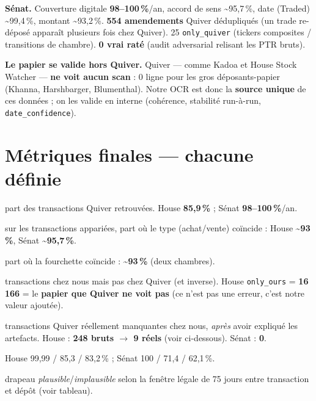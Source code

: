 \documentclass[11pt,a4paper]{article}
\newcommand{\code}[1]{\texttt{\small #1}}
\begin{document}
\textbf{Sénat.} Couverture digitale \textbf{98--100\,\%}/an, accord de sens \textasciitilde 95,7\,\%,
date (Traded) \textasciitilde 99,4\,\%, montant \textasciitilde 93,2\,\%. \textbf{554 amendements}
Quiver dédupliqués (un trade re-déposé apparaît plusieurs fois chez Quiver). 25 \code{only\_quiver}
(tickers composites / transitions de chambre). \textbf{0 vrai raté} (audit adversarial relisant les PTR
bruts).

\textbf{Le papier se valide hors Quiver.} Quiver --- comme Kadoa et House Stock Watcher --- \textbf{ne
voit aucun scan} : 0 ligne pour les gros déposants-papier (Khanna, Harshbarger, Blumenthal). Notre OCR
est donc la \textbf{source unique} de ces données ; on les valide en interne (cohérence, stabilité
run-à-run, \code{date\_confidence}).

\section{Métriques finales --- chacune définie}

\begin{description}[leftmargin=1.4em,style=nextline,nosep]
\item[Couverture (Quiver)] part des transactions Quiver retrouvées. House \textbf{85,9\,\%} ; Sénat
\textbf{98--100\,\%}/an.
\item[Accord de sens] sur les transactions appariées, part où le type (achat/vente) coïncide :
House \textbf{\textasciitilde 93\,\%}, Sénat \textbf{\textasciitilde 95,7\,\%}.
\item[Accord de montant] part où la fourchette coïncide : \textbf{\textasciitilde 93\,\%} (deux chambres).
\item[\code{only\_ours} / \code{only\_quiver}] transactions chez nous mais pas chez Quiver (et inverse).
House \code{only\_ours} = \textbf{16\,166} = le \textbf{papier que Quiver ne voit pas} (ce n'est pas une
erreur, c'est notre valeur ajoutée).
\item[Vrais-absents] transactions Quiver réellement manquantes chez nous, \emph{après} avoir expliqué
les artefacts. House : \textbf{248 bruts $\rightarrow$ 9 réels} (voir ci-dessous). Sénat : \textbf{0}.
\item[Identité / ticker / secteur] House 99,99 / 85,3 / 83,2\,\% ; Sénat 100 / 71,4 / 62,1\,\%.
\item[\code{date\_confidence}] drapeau \emph{plausible}/\emph{implausible} selon la fenêtre légale de
75 jours entre transaction et dépôt (voir tableau).
\end{description}
\end{document}

